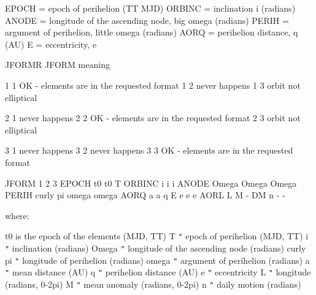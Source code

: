 \documentclass[twoside,11pt,nolof]{starlink}
\begin{document}
{{         EPOCH  = epoch of perihelion (TT MJD)
         ORBINC = inclination i (radians)
         ANODE  = longitude of the ascending node, big omega (radians)
         PERIH  = argument of perihelion, little omega (radians)
         AORQ   = perihelion distance, q (AU)
         E      = eccentricity, e

         JFORMR   JFORM     meaning

           1        1       OK - elements are in the requested format
           1        2       never happens
           1        3       orbit not elliptical

           2        1       never happens
           2        2       OK - elements are in the requested format
           2        3       orbit not elliptical

           3        1       never happens
           3        2       never happens
           3        3       OK - elements are in the requested format

          JFORM         1              2              3
          EPOCH         t0             t0             T
          ORBINC        i              i              i
          ANODE         Omega          Omega          Omega
          PERIH         curly pi       omega          omega
          AORQ          a              a              q
          E             e              e              e
          AORL          L              M              -
          DM            n              -              -

      where:

          t0           is the epoch of the elements (MJD, TT)
          T              \texttt{"}     epoch of perihelion (MJD, TT)
          i              \texttt{"}     inclination (radians)
          Omega          \texttt{"}     longitude of the ascending node (radians)
          curly pi       \texttt{"}     longitude of perihelion (radians)
          omega          \texttt{"}     argument of perihelion (radians)
          a              \texttt{"}     mean distance (AU)
          q              \texttt{"}     perihelion distance (AU)
          e              \texttt{"}     eccentricity
          L              \texttt{"}     longitude (radians, 0-2pi)
          M              \texttt{"}     mean anomaly (radians, 0-2pi)
          n              \texttt{"}     daily motion (radians)
      \sstitemlist{

}}}
\end{document}
